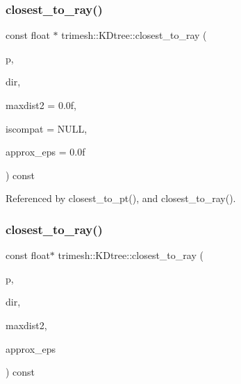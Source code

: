 \subsubsection{\texorpdfstring{closest\+\_\+to\+\_\+ray()}{closest\_to\_ray()}\hspace{0.1cm}{\footnotesize\ttfamily [1/2]}}
{\footnotesize\ttfamily const float $\ast$ trimesh\+::\+K\+Dtree\+::closest\+\_\+to\+\_\+ray (\begin{DoxyParamCaption}\item[{const float $\ast$}]{p,  }\item[{const float $\ast$}]{dir,  }\item[{float}]{maxdist2 = {\ttfamily 0.0f},  }\item[{const \hyperlink{structtrimesh_1_1KDtree_1_1CompatFunc}{Compat\+Func} $\ast$}]{iscompat = {\ttfamily NULL},  }\item[{float}]{approx\+\_\+eps = {\ttfamily 0.0f} }\end{DoxyParamCaption}) const}



Referenced by closest\+\_\+to\+\_\+pt(), and closest\+\_\+to\+\_\+ray().

\mbox{\label{classtrimesh_1_1KDtree_a686507f137048b734f4cc35700461701}} 
\subsubsection{\texorpdfstring{closest\+\_\+to\+\_\+ray()}{closest\_to\_ray()}\hspace{0.1cm}{\footnotesize\ttfamily [2/2]}}
{\footnotesize\ttfamily const float$\ast$ trimesh\+::\+K\+Dtree\+::closest\+\_\+to\+\_\+ray (\begin{DoxyParamCaption}\item[{const float $\ast$}]{p,  }\item[{const float $\ast$}]{dir,  }\item[{float}]{maxdist2,  }\item[{float}]{approx\+\_\+eps }\end{DoxyParamCaption}) const\hspace{0.3cm}{\ttfamily [inline]}}

\mbox{\label{classtrimesh_1_1KDtree_ad8e2126c11fce117f6fa699301348173}} 
